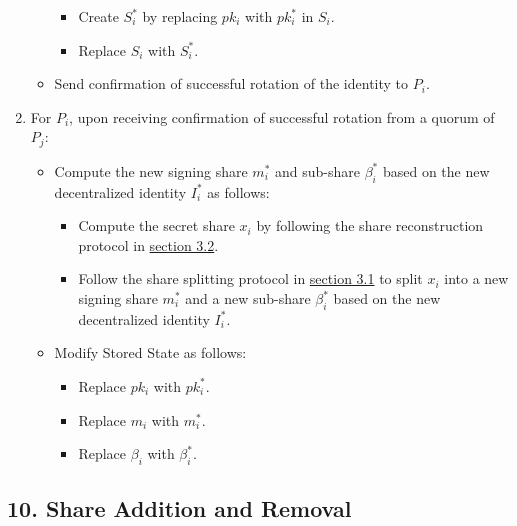 \documentclass[
]{article}
\providecommand{\tightlist}{%
  \setlength{\itemsep}{0pt}\setlength{\parskip}{0pt}}
\begin{document}
\begin{enumerate}
\begin{itemize}
    \begin{itemize}
    \tightlist
    \item
      Create \(S_i^ \ast\) by replacing \(pk_i\) with \(pk_i^ \ast\) in
      \(S_i\).
    \item
      Replace \(S_i\) with \(S_i^ \ast\).
    \end{itemize}
  \item
    Send confirmation of successful rotation of the identity to \(P_i\).
  \end{itemize}
\item
  For \(P_i\), upon receiving confirmation of successful rotation from a
  quorum of \(P_j\):

  \begin{itemize}
  \tightlist
  \item
    Compute the new signing share \(m_i^ \ast\) and sub-share
    \(\beta _i^ \ast\) based on the new decentralized identity
    \(I_i^ \ast\) as follows:

    \begin{itemize}
    \tightlist
    \item
      Compute the secret share \(x_i\) by following the share
      reconstruction protocol in
      \protect\hyperlink{share-reconstruction}{section 3.2}.
    \item
      Follow the share splitting protocol in
      \protect\hyperlink{share-splitting}{section 3.1} to split \(x_i\)
      into a new signing share \(m_i^ \ast\) and a new sub-share
      \(\beta _i^ \ast\) based on the new decentralized identity
      \(I_i^ \ast\).
    \end{itemize}
  \item
    Modify Stored State as follows:

    \begin{itemize}
    \tightlist
    \item
      Replace \(pk_i\) with \(pk_i^ \ast\).
    \item
      Replace \(m_i\) with \(m_i^ \ast\).
    \item
      Replace \(\beta _i\) with \(\beta _i^ \ast\).
    \end{itemize}
  \end{itemize}
\end{enumerate}

\hypertarget{share-addition-and-removal}{%
\subsection{10. Share Addition and
Removal}\label{share-addition-and-removal}}
\end{document}
